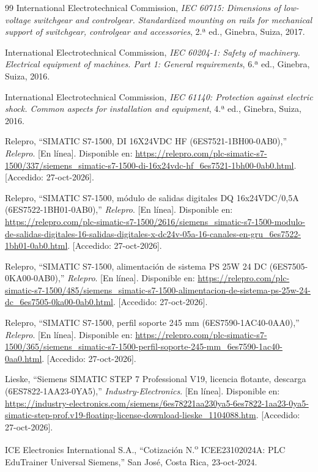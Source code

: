 \documentclass[12pt,a4paper,oneside]{report}
\begin{document}
\begin{thebibliography}{99}
International Electrotechnical Commission, \emph{IEC 60715: Dimensions of low-voltage switchgear and controlgear. Standardized mounting on rails for mechanical support of switchgear, controlgear and accessories}, 2.ª ed., Ginebra, Suiza, 2017.

International Electrotechnical Commission, \emph{IEC 60204-1: Safety of machinery. Electrical equipment of machines. Part 1: General requirements}, 6.ª ed., Ginebra, Suiza, 2016.

International Electrotechnical Commission, \emph{IEC 61140: Protection against electric shock. Common aspects for installation and equipment}, 4.ª ed., Ginebra, Suiza, 2016.

Relepro, ``SIMATIC S7-1500, DI 16X24VDC HF (6ES7521-1BH00-0AB0),'' \emph{Relepro}. [En línea]. Disponible en: \url{https://relepro.com/plc-simatic-s7-1500/337/siemens_simatic-s7-1500-di-16x24vdc-hf_6es7521-1bh00-0ab0.html}. [Accedido: 27-oct-2026].

Relepro, ``SIMATIC S7-1500, módulo de salidas digitales DQ 16x24VDC/0,5A (6ES7522-1BH01-0AB0),'' \emph{Relepro}. [En línea]. Disponible en: \url{https://relepro.com/plc-simatic-s7-1500/2616/siemens_simatic-s7-1500-modulo-de-salidas-digitales-16-salidas-digitales-x-dc24v-05a-16-canales-en-gru_6es7522-1bh01-0ab0.html}. [Accedido: 27-oct-2026].

Relepro, ``SIMATIC S7-1500, alimentación de sistema PS 25W 24 DC (6ES7505-0KA00-0AB0),'' \emph{Relepro}. [En línea]. Disponible en: \url{https://relepro.com/plc-simatic-s7-1500/485/siemens_simatic-s7-1500-alimentacion-de-sistema-ps-25w-24-dc_6es7505-0ka00-0ab0.html}. [Accedido: 27-oct-2026].

Relepro, ``SIMATIC S7-1500, perfil soporte 245 mm (6ES7590-1AC40-0AA0),'' \emph{Relepro}. [En línea]. Disponible en: \url{https://relepro.com/plc-simatic-s7-1500/365/siemens_simatic-s7-1500-perfil-soporte-245-mm_6es7590-1ac40-0aa0.html}. [Accedido: 27-oct-2026].

Lieske, ``Siemens SIMATIC STEP 7 Professional V19, licencia flotante, descarga (6ES7822-1AA23-0YA5),'' \emph{Industry-Electronics}. [En línea]. Disponible en: \url{https://industry-electronics.com/siemens/6es78221aa230ya5-6es7822-1aa23-0ya5-simatic-step-prof.v19-floating-license-download-lieske_1104088.htm}. [Accedido: 27-oct-2026].

ICE Electronics International S.A., ``Cotización N.\textsuperscript{o} ICEE23102024A: PLC EduTrainer Universal Siemens,'' San José, Costa Rica, 23-oct-2024.

\end{thebibliography}
\end{document}
